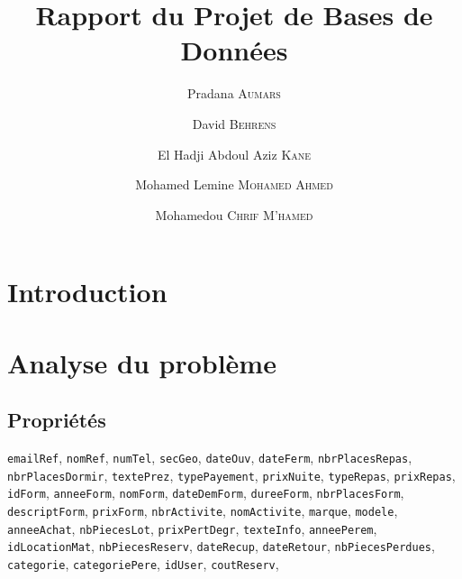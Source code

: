 \documentclass[12pt, a4paper]{article}
\title{Rapport du Projet de Bases de Données}
\author{Pradana \textsc{Aumars}
  \and
  David \textsc{Behrens}
  \and
  El Hadji Abdoul Aziz \textsc{Kane}
  \and
  Mohamed Lemine \textsc{Mohamed Ahmed}
  \and
  Mohamedou \textsc{Chrif M'hamed}}
\newcommand\att[1]{\textnhtt{#1}}
\begin{document}
\maketitle
\section{Introduction}
\section{Analyse du problème}
\subsection*{Propriétés}
\att{emailRef}, %
\att{nomRef}, %
\att{numTel}, %
\att{secGeo}, %
\att{dateOuv}, %
\att{dateFerm}, %
\att{nbrPlacesRepas}, %
\att{nbrPlacesDormir}, %
\att{textePrez}, %
\att{typePayement}, %
\att{prixNuite}, %
\att{typeRepas}, %
\att{prixRepas}, %
\att{idForm}, %
\att{anneeForm}, %
\att{nomForm}, %
\att{dateDemForm}, %
\att{dureeForm}, %
\att{nbrPlacesForm}, %
\att{descriptForm}, %
\att{prixForm}, %
\att{nbrActivite}, %
\att{nomActivite}, %
\att{marque}, %
\att{modele}, %
\att{anneeAchat}, %
\att{nbPiecesLot}, %
\att{prixPertDegr}, %
\att{texteInfo}, %
\att{anneePerem}, %
\att{idLocationMat}, %
\att{nbPiecesReserv}, %
\att{dateRecup},
\att{dateRetour},
\att{nbPiecesPerdues},
\att{categorie}, %
\att{categoriePere}, %
\att{idUser}, %
\att{coutReserv},
\end{document}
